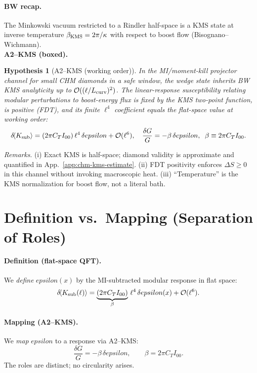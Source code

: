 \documentclass[aps,prd,onecolumn,superscriptaddress,nofootinbib]{revtex4-2}
\def\eps{epsilon}%
\providecommand{\eps}{\varepsilon}
\newtheorem{hypothesis}{Hypothesis}
\begin{document}
\paragraph{BW recap.} The Minkowski vacuum restricted to a Rindler half-space is a KMS state at inverse temperature \(\beta_{\rm KMS}=2\pi/\kappa\) with respect to boost flow (Bisognano--Wichmann).\\[3pt]
\noindent\textbf{A2--KMS (boxed).}
\begin{hypothesis}[A2--KMS (working order)]
\label{hyp:A2KMS}
In the MI/moment-kill projector channel for small CHM diamonds in a safe window, the wedge state inherits BW KMS analyticity up to \(\mathcal O((\ell/L_{\rm curv})^2)\). The linear-response susceptibility relating modular perturbations to boost-energy flux is fixed by the KMS two-point function, is positive (FDT), and its finite \(\ell^4\) coefficient equals the flat-space value at working order:
\[
\delta\!\langle K_{\rm sub}\rangle=(2\pi C_T I_{00})\,\ell^4\,\delta\eps+\mathcal O(\ell^6),\quad
\frac{\delta G}{G}=-\beta\,\delta\eps,\;\;\beta\equiv 2\pi C_T I_{00}.
\]
\end{hypothesis}
\noindent\emph{Remarks.} (i) Exact KMS is half-space; diamond validity is approximate and quantified in App.~\ref{app:chm-kms-estimate}. (ii) FDT positivity enforces \(\Delta S\ge 0\) in this channel without invoking macroscopic heat. (iii) ``Temperature'' is the KMS normalization for boost flow, not a literal bath.

\section{Definition vs.\ Mapping (Separation of Roles)}
\label{sec:def-vs-map}
\paragraph{Definition (flat-space QFT).} We \emph{define} \(\eps(x)\) by the MI-subtracted modular response in flat space:
\begin{equation}
\label{eq:eps-def}
\delta\!\langle K_{\rm sub}(\ell)\rangle = \underbrace{(2\pi C_T I_{00})}_{\beta}\,\ell^4\,\delta\eps(x) + \mathcal O(\ell^6).
\end{equation}
\paragraph{Mapping (A2--KMS).} We \emph{map} \(\eps\) to a response via A2--KMS:
\begin{equation}
\label{eq:mapping}
\frac{\delta G}{G}=-\beta\,\delta\eps,\qquad \beta=2\pi C_T I_{00}.
\end{equation}
The roles are distinct; no circularity arises.
\end{document}
